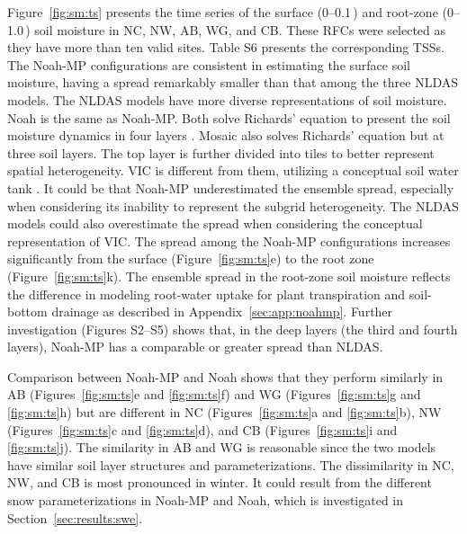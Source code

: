 \documentclass[essd, manuscript]{copernicus}
\let\unit\undefined
\begin{document}
Figure~\ref{fig:sm:ts} presents the time series of the surface (0--0.1\,\unit{m}) and root-zone (0--1.0\,\unit{m}) soil moisture in NC, NW, AB, WG, and CB\@. These RFCs were selected as they have more than ten valid sites. Table S6 presents the corresponding TSSs. The Noah-MP configurations are consistent in estimating the surface soil moisture, having a spread remarkably smaller than that among the three NLDAS models. The NLDAS models have more diverse representations of soil moisture. Noah is the same as Noah-MP\@. Both solve Richards' equation to present the soil moisture dynamics in four layers \citep{niu2011JGRA}. Mosaic also solves Richards' equation but at three soil layers. The top layer is further divided into tiles to better represent spatial heterogeneity\citep{koster1992JGRA}. VIC is different from them, utilizing a conceptual soil water tank \citep{liang1994JGRA}. It could be that Noah-MP underestimated the ensemble spread, especially when considering its inability to represent the subgrid heterogeneity. The NLDAS models could also overestimate the spread when considering the conceptual representation of VIC\@. The spread among the Noah-MP configurations increases significantly from the surface (Figure~\ref{fig:sm:ts}e) to the root zone (Figure~\ref{fig:sm:ts}k). The ensemble spread in the root-zone soil moisture reflects the difference in modeling root-water uptake for plant transpiration and soil-bottom drainage as described in Appendix~\ref{sec:app:noahmp}. Further investigation (Figures S2--S5) shows that, in the deep layers (the third and fourth layers), Noah-MP has a comparable or greater spread than NLDAS\@.

Comparison between Noah-MP and Noah shows that they perform similarly in AB (Figures~\ref{fig:sm:ts}e and \ref{fig:sm:ts}f) and WG (Figures~\ref{fig:sm:ts}g and \ref{fig:sm:ts}h) but are different in NC (Figures~\ref{fig:sm:ts}a and \ref{fig:sm:ts}b), NW (Figures~\ref{fig:sm:ts}c and \ref{fig:sm:ts}d), and CB (Figures~\ref{fig:sm:ts}i and \ref{fig:sm:ts}j). The similarity in AB and WG is reasonable since the two models have similar soil layer structures and parameterizations. The dissimilarity in NC, NW, and CB is most pronounced in winter. It could result from the different snow parameterizations in Noah-MP and Noah, which is investigated in Section~\ref{sec:results:swe}.
\end{document}
